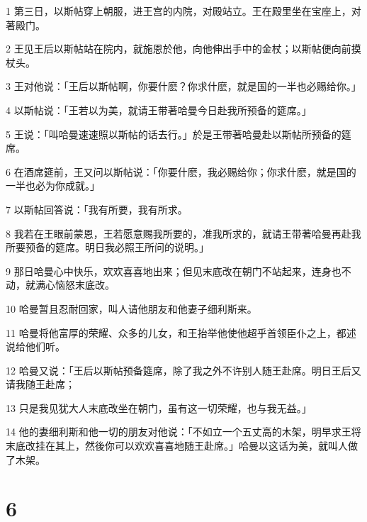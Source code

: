 \par 1 第三日，以斯帖穿上朝服，进王宫的内院，对殿站立。王在殿里坐在宝座上，对著殿门。
\par 2 王见王后以斯帖站在院内，就施恩於他，向他伸出手中的金杖；以斯帖便向前摸杖头。
\par 3 王对他说：「王后以斯帖啊，你要什麽？你求什麽，就是国的一半也必赐给你。」
\par 4 以斯帖说：「王若以为美，就请王带著哈曼今日赴我所预备的筵席。」
\par 5 王说：「叫哈曼速速照以斯帖的话去行。」於是王带著哈曼赴以斯帖所预备的筵席。
\par 6 在酒席筵前，王又问以斯帖说：「你要什麽，我必赐给你；你求什麽，就是国的一半也必为你成就。」
\par 7 以斯帖回答说：「我有所要，我有所求。
\par 8 我若在王眼前蒙恩，王若愿意赐我所要的，准我所求的，就请王带著哈曼再赴我所要预备的筵席。明日我必照王所问的说明。」
\par 9 那日哈曼心中快乐，欢欢喜喜地出来；但见末底改在朝门不站起来，连身也不动，就满心恼怒末底改。
\par 10 哈曼暂且忍耐回家，叫人请他朋友和他妻子细利斯来。
\par 11 哈曼将他富厚的荣耀、众多的儿女，和王抬举他使他超乎首领臣仆之上，都述说给他们听。
\par 12 哈曼又说：「王后以斯帖预备筵席，除了我之外不许别人随王赴席。明日王后又请我随王赴席；
\par 13 只是我见犹大人末底改坐在朝门，虽有这一切荣耀，也与我无益。」
\par 14 他的妻细利斯和他一切的朋友对他说：「不如立一个五丈高的木架，明早求王将末底改挂在其上，然後你可以欢欢喜喜地随王赴席。」哈曼以这话为美，就叫人做了木架。

\chapter{6}

